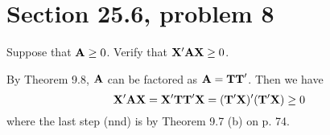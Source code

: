 \section{Section 25.6, problem 8}
Suppose that ${\bf A}\ge0$. Verify that ${\bf X}'{\bf AX}\ge0$.

\bigskip
\noindent
By Theorem 9.8, $\bf A$ can be factored as ${\bf A}={\bf TT}'$.
Then we have
$${\bf X}'{\bf AX}={\bf X}'{\bf TT}'{\bf X}=
({\bf T}'{\bf X})'({\bf T}'{\bf X})\ge0$$
where the last step (nnd) is by
Theorem 9.7 (b) on p. 74.
